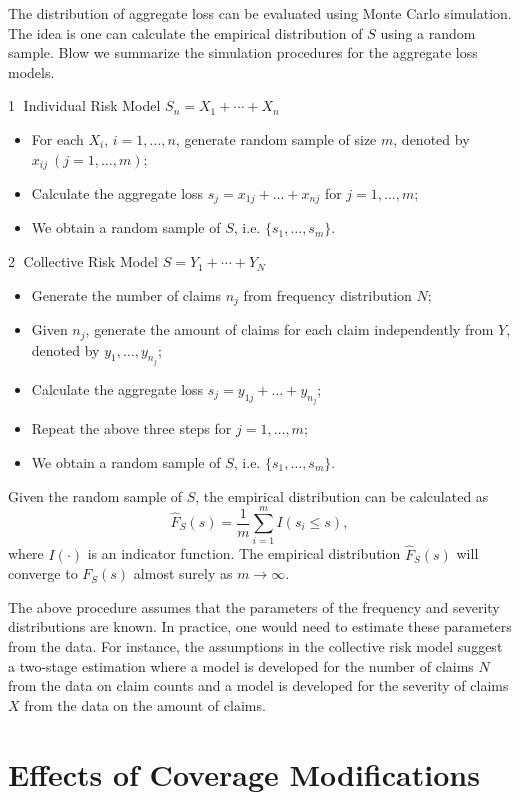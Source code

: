 \documentclass[12pt,letterpaper]{article}
\begin{document}
The distribution of aggregate loss can be evaluated using Monte Carlo simulation. The idea is one can calculate the empirical distribution of $S$ using a random sample. Blow we summarize the simulation procedures for the aggregate loss models.

\bigskip
\noindent\textcircled{1} Individual Risk Model $S_n=X_1+\cdots+X_n$
 \begin{itemize}
   \item For each $X_i$, $i=1,\ldots,n$, generate random sample of size $m$, denoted by $x_{ij}~(j=1,\ldots,m)$;
   \item Calculate the aggregate loss $s_j=x_{1j}+\ldots+x_{nj}$ for $j=1,\ldots,m$;
   \item We obtain a random sample of $S$, i.e. $\{s_1,\ldots,s_m\}$.
 \end{itemize}

\noindent\textcircled{2} Collective Risk Model $S=Y_1+\cdots+Y_N$
  \begin{itemize}
   \item Generate the number of claims $n_j$ from frequency distribution $N$;
   \item Given $n_j$, generate the amount of claims for each claim independently from $Y$, denoted by $y_{1},\ldots,y_{n_j}$;
   \item Calculate the aggregate loss $s_j=y_{1j}+\ldots+y_{n_j}$;
   \item Repeat the above three steps for $j=1,\ldots,m$;
   \item We obtain a random sample of $S$, i.e. $\{s_1,\ldots,s_m\}$.
 \end{itemize}

Given the random sample of $S$, the empirical distribution can be calculated as
$$\hat{F}_S(s)=\frac{1}{m}\sum_{i=1}^{m}I(s_i\leq s),$$
where $I(\cdot)$ is an indicator function. The empirical distribution $\hat{F}_S(s)$ will converge to ${F}_S(s)$ almost surely as $m\rightarrow \infty$.

The above procedure assumes that the parameters of the frequency and severity distributions are known. In practice, one would need to estimate these parameters from the data. For instance, the assumptions in the collective risk model suggest a two-stage estimation where a model is developed for the number of claims $N$ from the data on claim counts and a model is developed for the severity of claims $X$ from the data on the amount of claims.

\section{Effects of Coverage Modifications}
\end{document}
